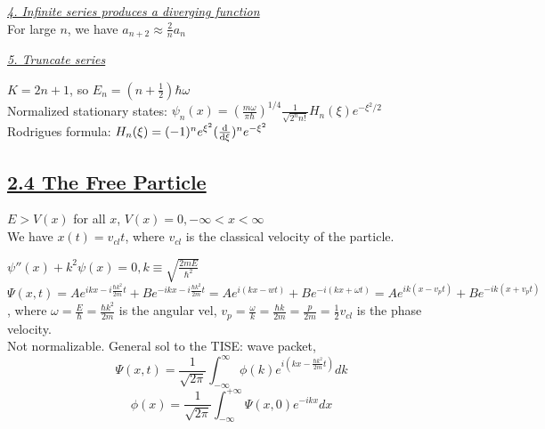 
\textit{\underline{4. Infinite series produces a diverging function}} \\

For large $n$, we have $a_{n+2} \approx \frac{2}{n} a_n$ 

\textit{\underline{5. Truncate series}}


$K = 2n + 1$, so $E_n = (n + \frac{1}{2}) \hbar \omega$ \\
Normalized stationary states:
$\psi_n(x) = (\frac{m \omega}{\pi \hbar})^{1/4} \frac{1}{\sqrt{2^n n!}} H_n(\xi) e^{-\xi^2 / 2}$ \\

Rodrigues formula: $H_n(\xi) = (-1)^n e^{\xi^2} (\dv{}{\xi})^n e^{-\xi^2}$




\subsection{\underline{2.4 The Free Particle}}
$E > V(x)$ for all $x$, $V(x) = 0, -\infty < x < \infty$ \\

We have $x(t) = v_{cl} t$, where $v_{cl}$ is the classical velocity of the particle.

$\psi''(x) + k^2 \psi(x) = 0, k \equiv \sqrt{\frac{2mE}{\hbar^2}}$ \\
$\Psi(x, t) = Ae^{ikx - i \frac{\hbar k^2}{2m} t} + Be^{-ikx - i \frac{\hbar k^2}{2m} t} = A e^{i(kx - wt)} + Be^{-i(kx + \omega t)} = A e^{ik(x - v_p t)} + Be^{-ik(x + v_{p} t)}$,
where $\omega = \frac{E}{\hbar} = \frac{\hbar k^2}{2m}$ is the angular vel, $v_p = \frac{\omega}{k} = \frac{\hbar k }{2m} = \frac{p}{2m} = \frac{1}{2} v_{cl}$ is the phase velocity. \\

Not normalizable. General sol to the TISE: wave packet, 
$$\Psi(x, t) = \frac{1}{\sqrt{2\pi}} \int_{-\infty}^{\infty} \phi(k) e^{i (kx - \frac{\hbar k^2}{2m} t)} dk$$
$$\phi(x) = \frac{1}{\sqrt{2 \pi}} \int_{-\infty}^{+\infty} \Psi(x, 0) e^{-ikx} dx$$

